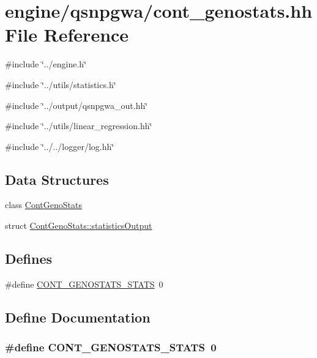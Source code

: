 \hypertarget{cont__genostats_8hh}{
\section{engine/qsnpgwa/cont\_\-genostats.hh File Reference}
\label{cont__genostats_8hh}
}
{\ttfamily \#include \char`\"{}../engine.h\char`\"{}}\par
{\ttfamily \#include \char`\"{}../utils/statistics.h\char`\"{}}\par
{\ttfamily \#include \char`\"{}../output/qsnpgwa\_\-out.hh\char`\"{}}\par
{\ttfamily \#include \char`\"{}../utils/linear\_\-regression.hh\char`\"{}}\par
{\ttfamily \#include \char`\"{}../../logger/log.hh\char`\"{}}\par
\subsection*{Data Structures}
\begin{DoxyCompactItemize}
\item 
class \hyperlink{classContGenoStats}{ContGenoStats}
\item 
struct \hyperlink{structContGenoStats_1_1statisticsOutput}{ContGenoStats::statisticsOutput}
\end{DoxyCompactItemize}
\subsection*{Defines}
\begin{DoxyCompactItemize}
\item 
\#define \hyperlink{cont__genostats_8hh_a046156af077879b5287605a7dafcac9c}{CONT\_\-GENOSTATS\_\-STATS}~0
\end{DoxyCompactItemize}


\subsection{Define Documentation}
\hypertarget{cont__genostats_8hh_a046156af077879b5287605a7dafcac9c}{
\subsubsection[{CONT\_\-GENOSTATS\_\-STATS}]{\setlength{\rightskip}{0pt plus 5cm}\#define CONT\_\-GENOSTATS\_\-STATS~0}}
\label{cont__genostats_8hh_a046156af077879b5287605a7dafcac9c}
